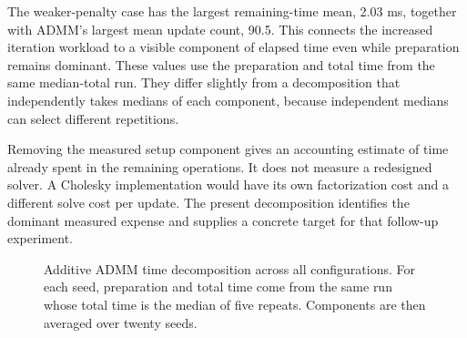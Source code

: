 \documentclass{article}
\begin{document}
The weaker-penalty case has the largest remaining-time mean, 2.03 ms, together with ADMM's largest mean update count, 90.5. This connects the increased iteration workload to a visible component of elapsed time even while preparation remains dominant. These values use the preparation and total time from the same median-total run. They differ slightly from a decomposition that independently takes medians of each component, because independent medians can select different repetitions.

Removing the measured setup component gives an accounting estimate of time already spent in the remaining operations. It does not measure a redesigned solver. A Cholesky implementation would have its own factorization cost and a different solve cost per update. The present decomposition identifies the dominant measured expense and supplies a concrete target for that follow-up experiment.

\begin{figure}[htbp]\centering
{}
\caption{Additive ADMM time decomposition across all configurations. For each seed, preparation and total time come from the same run whose total time is the median of five repeats. Components are then averaged over twenty seeds.}\label{fig:setup}
\end{figure}
\end{document}
